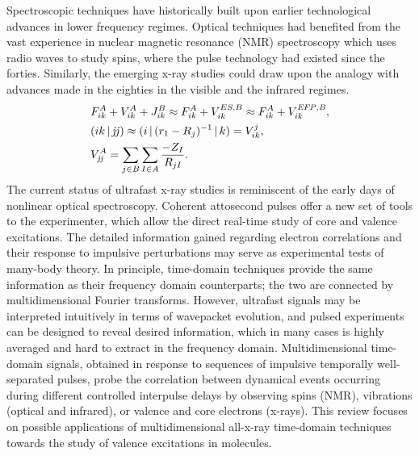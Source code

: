\documentclass{ar-1col}
\begin{document}
Spectroscopic techniques have historically built upon earlier technological
advances in lower frequency regimes.  Optical
techniques had benefited from the vast experience in nuclear magnetic
resonance (NMR) spectroscopy which uses radio waves to study
spins, where the pulse technology had existed since the
forties. Similarly, the emerging x-ray studies could draw upon the
analogy with advances made in the eighties in the visible and the infrared
regimes.
\begin{eqnarray*}
&\displaystyle F_{ik}^A  + V_{ik}^A  + {J}_{ik}^B  \approx F_{ik}^A  + V_{ik}^{ES,B}  \approx F_{ik}^A  + V_{ik}^{\it EFP,B} ,\\
&\displaystyle (ik\,{\mid}\, {\it jj}) \approx ( {i\,{\mid}\, (r_1  - R_{j} )^{ - 1} \,{\mid}\, k} ) = V_{ik}^j ,\\
&\displaystyle V_{\it jj}^A  = \sum_{j \in B} {\sum_{I \in A} {\frac{{ - Z_I }}{{R_{jI} }}} } .
\end{eqnarray*}
The current status of ultrafast x-ray studies is reminiscent
of the early days of nonlinear optical
spectroscopy.\cite{bucksbaum_chapter_2011} Coherent attosecond
pulses\cite{walmsley_characterization_2009} offer a new set of tools
to the experimenter, which allow the direct real-time study of core and valence
excitations.\cite{adams_nonlinear_2003} The detailed
information gained regarding electron correlations and their response to
impulsive perturbations may serve as experimental tests of many-body
theory.  In principle, time-domain techniques provide the same
information as their frequency domain counterparts; the two are connected by multidimensional Fourier transforms.\cite{Mukamel1995}  However,
ultrafast signals may be interpreted intuitively in
terms of wavepacket evolution, and pulsed experiments can be designed to
reveal desired information, which in many cases is highly averaged and hard to extract in
the frequency domain.\cite{zewail_femtochemistry:_2000}
Multidimensional time-domain signals, obtained in response to sequences of impulsive temporally well-separated pulses, probe the correlation between
dynamical events occurring during different controlled interpulse delays by observing spins (NMR),
vibrations (optical and infrared), or valence and core electrons (x-rays).\cite{mukamel_coherent_2009} This review focuses on possible applications of
multidimensional all-x-ray time-domain techniques towards the study of valence excitations in
molecules.

\begin{marginnote}
\end{marginnote}
\end{document}
